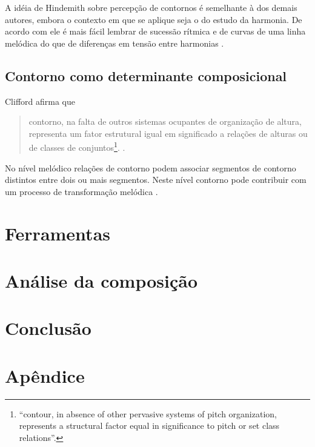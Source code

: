 \documentclass[12pt,brazil]{book}
\newcommand{\citacaoindt}[4]{
  \begin{quote}
    \normalsize
    {#2}\footnote{
      \selectlanguage{brazil}
      ``{#1}''.
    }.
    \selectlanguage{brazil}
    \cite[#3]{#4}.
  \end{quote}
}
\begin{document}
A idéia de Hindemith sobre percepção de contornos é semelhante à dos
demais autores, embora o contexto em que se aplique seja o do estudo
da harmonia. De acordo com ele é mais fácil lembrar de sucessão
rítmica e de curvas de uma linha melódica do que de diferenças em
tensão entre harmonias \cite[p. 175]{hindemith41:craft}.

\section{Contorno como determinante composicional}
\label{sec:cont-como-determ}

Clifford afirma que

\citacaoindt{contour, in absence of other pervasive systems of pitch
  organization, represents a structural factor equal in significance
  to pitch or set class relations}{contorno, na falta de outros
  sistemas ocupantes de organização de altura, representa um fator
  estrutural igual em significado a relações de alturas ou de classes
  de conjuntos}{p. 157}{clifford95:contour}

No nível melódico relações de contorno podem associar segmentos de
contorno distintos entre dois ou mais segmentos. Neste nível contorno
pode contribuir com um processo de transformação melódica
\cite[p. 159]{clifford95:contour}.


\chapter{Ferramentas}
\label{cha:ferramentas}

\chapter{Análise da composição}
\label{cha:anal-da-comp}

\chapter{Conclusão}
\label{cha:conclusao}





\chapter{Apêndice}
\label{cha:apendice}
\end{document}
